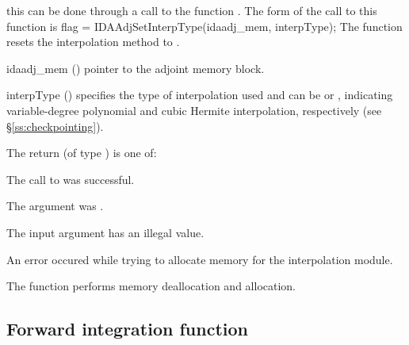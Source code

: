 this can be done through a call to the function .
The form of the call to this function is
{
  flag = IDAAdjSetInterpType(idaadj\_mem, interpType);
}
{
  The function  resets the interpolation method to .
}
{
  \begin{args}[interpType]
  \item[idaadj\_mem] ()
    pointer to the adjoint memory block.
  \item[interpType] ()
    specifies the type of interpolation used and can be 
    or , indicating variable-degree polynomial and cubic Hermite
    interpolation, respectively (see \S\ref{ss:checkpointing}).
  \end{args}
}
{
  The return  (of type ) is one of:
  \begin{args}
  \item[\Id{IDA\_SUCCESS}]
    The call to  was successful.
  \item[\Id{IDA\_ADJMEM\_NULL}]
    The  argument was .
  \item[\Id{IDA\_ILL\_INPUT}] 
    The input argument  has an illegal value.
  \item[\Id{IDA\_MEM\_FAIL}]
    An error occured while trying to allocate memory for the interpolation module.
  \end{args}
}
{
  The function  performs memory deallocation and allocation.
}


\subsection{Forward integration function}
\label{sss:idasolvef}

